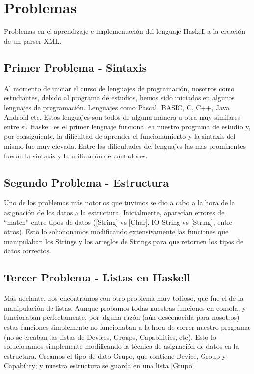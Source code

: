 \documentclass[11pt]{article} %
\begin{document}
\section{Problemas}


Problemas en el aprendizaje e implementación del lenguaje Haskell a la creación de un parser XML.



\subsection{Primer Problema - Sintaxis}

Al momento de iniciar el curso de lenguajes de programación, nosotros como estudiantes, debido al programa de estudios, hemos sido iniciados en algunos lenguajes de programación.  Lenguajes como Pascal, BASIC, C, C++, Java, Android  etc. Estos lenguajes son todos de alguna manera u otra muy similares entre sí. Haskell es el primer lenguaje funcional en nuestro programa de estudio y, por consiguiente, la dificultad de aprender el funcionamiento y la sintaxis del mismo fue muy elevada. Entre las dificultades del lenguajes las más prominentes fueron la sintaxis y la utilización de contadores.

\subsection{Segundo Problema - Estructura}

Uno de los problemas más notorios que tuvimos se dio a cabo a la hora de la asignación de los datos a la estructura. 
Inicialmente, aparecían errores de “match” entre tipos de datos ([String] vs [Char], IO String vs [String], entre otros). Esto lo solucionamos modificando extensivamente las funciones que manipulaban los Strings y los arreglos de Strings para que retornen los tipos de datos correctos. 

\subsection{Tercer Problema - Listas en Haskell}

Más adelante, nos encontramos con otro problema muy tedioso, que fue el de la manipulación de listas. Aunque probamos todas nuestras funciones en consola, y funcionaban perfectamente, por alguna razón (aún desconocida para nosotros) estas funciones simplemente no funcionaban a la hora de correr nuestro programa (no se creaban las listas de Devices, Groups, Capabilities, etc). Esto lo solucionamos simplemente modificando la técnica de asignación de datos en la estructura. Creamos el tipo de dato Grupo, que contiene Device, Group y Capability; y nuestra estructura se guarda en una lista [Grupo].
\end{document}
